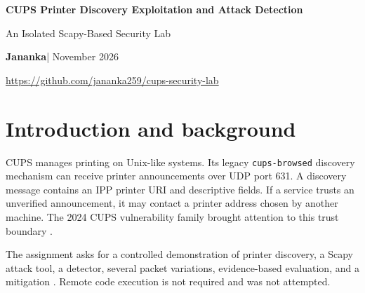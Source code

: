 \documentclass[11pt,a4paper]{article}
\begin{document}
\begin{center}
{\Large\bfseries\color{ink} CUPS Printer Discovery Exploitation and Attack Detection}\par
\vspace{5pt}
{\large An Isolated Scapy-Based Security Lab}\par
\vspace{9pt}
\textbf{Jananka}\quad | \quad November 2026\par
\vspace{5pt}
\url{https://github.com/jananka259/cups-security-lab}
\end{center}

\begin{abstract}
This report examines how a vulnerable CUPS service handles printer discovery messages. We built an isolated Docker network with a Scapy attacker, a vulnerable \texttt{cups-browsed} victim, and a virtual IPP printer. We generated normal and modified advertisements, recorded traffic, tested a Scapy detection tool, and applied an allowlist defence. Normal discovery led to a TCP connection and IPP requests, although printer queue creation failed. An unauthorized advertisement was sent and detected, but the available captures do not establish that the victim contacted the attacker-advertised endpoint. The distinction between sending an advertisement, processing it, connecting to a printer, and creating a queue is central to the results.
\end{abstract}

\section{Introduction and background}
CUPS manages printing on Unix-like systems. Its legacy \texttt{cups-browsed} discovery mechanism can receive printer announcements over UDP port 631. A discovery message contains an IPP printer URI and descriptive fields. If a service trusts an unverified announcement, it may contact a printer address chosen by another machine. The 2024 CUPS vulnerability family brought attention to this trust boundary \cite{vulhub}.

The assignment asks for a controlled demonstration of printer discovery, a Scapy attack tool, a detector, several packet variations, evidence-based evaluation, and a mitigation \cite{assignment}. Remote code execution is not required and was not attempted.
\end{document}
